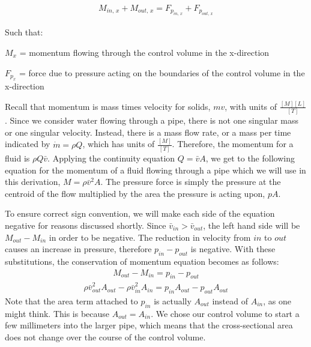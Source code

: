 \documentclass[letterpaper,10pt,english]{sphinxmanual}
\begin{document}
\begin{equation}\label{equation:Review/Review_Fluid_Mechanics_Derivations:Review/Review_Fluid_Mechanics_Derivations:3}
\begin{split}M_{in, \, x} + M_{out, \, x} = F_{p_{in, \, x}} + F_{p_{out, \, x}}\end{split}
\end{equation}
\begin{DUlineblock}{0em}
\item[] Such that:
\item[] \(M_{x}\) = momentum flowing through the control volume in the x-direction
\item[] \(F_{p_x}\) = force due to pressure acting on the boundaries of the control volume in the x-direction
\end{DUlineblock}

Recall that momentum is mass times velocity for solids, \(m v\), with units of \(\frac{[M][L]}{[T]}\). Since we consider water flowing through a pipe, there is not one singular mass or one singular velocity. Instead, there is a mass flow rate, or a mass per time indicated by \(\dot m = \rho Q\), which has units of \(\frac{[M]}{[T]}\). Therefore, the momentum for a fluid is \(\rho Q \bar v\). Applying the continuity equation \(Q = \bar v A\), we get to the following equation for the momentum of a fluid flowing through a pipe which we will use in this derivation, \(M = \rho \bar v^2 A\). The pressure force is simply the pressure at the centroid of the flow multiplied by the area the pressure is acting upon, \(p A\).

To ensure correct sign convention, we will make each side of the equation negative for reasons discussed shortly. Since \(\bar v_{in} > \bar v_{out}\), the left hand side will be \(M_{out} - M_{in}\) in order to be negative. The reduction in velocity from \(in\) to \(out\) causes an increase in pressure, therefore \(p_{in} - p_{out}\) is negative. With these substitutions, the conservation of momentum equation becomes as follows:
\begin{equation}\label{equation:Review/Review_Fluid_Mechanics_Derivations:Review/Review_Fluid_Mechanics_Derivations:4}
\begin{split}M_{out} - M_{in} = p_{in} - p_{out}\end{split}
\end{equation}\begin{equation}\label{equation:Review/Review_Fluid_Mechanics_Derivations:Review/Review_Fluid_Mechanics_Derivations:5}
\begin{split}\rho \bar v_{out}^2 A_{out} - \rho \bar v_{in}^2 A_{in} = p_{in} A_{out} - p_{out} A_{out}\end{split}
\end{equation}
Note that the area term attached to \(p_{in}\) is actually \(A_{out}\) instead of \(A_{in}\), as one might think. This is because \(A_{out} = A_{in}\). We chose our control volume to start a few millimeters into the larger pipe, which means that the cross-sectional area does not change over the course of the control volume.
\end{document}
